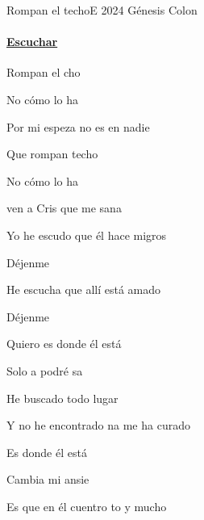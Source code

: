 \documentclass[12pt, spanish]{book}
\begin{document}
    \begin{song}{Rompan el techo}{E}
        {2024} %
        {Génesis Colon}
        {} %
        {}
        \ifChordBk
        \paragraph{\mbox{}\hfill\protect\href{https://open.spotify.com/intl-es/track/7dooEx4uwQ7Z2eZoMdmtZT}{Escuchar}\mbox{}\hfill}
        \fi

        \begin{SBOpGroup}
            Rompan el cho

            No  cómo lo ha

            Por mi espeza no es en nadie 
        \end{SBOpGroup}

        \begin{SBOpGroup}
            Que rompan  techo

            No  cómo lo ha

            ven a Cris que  me sana
        \end{SBOpGroup}

        \begin{SBOpGroup}
            Yo he escudo que él hace migros

            Déjenme 

            He escucha que allí está  amado

            Déjenme 
        \end{SBOpGroup}

        \begin{SBChorus}
            Quiero es donde él está

            Solo a podré sa

            He buscado  todo lugar

            Y no he encontrado na me ha curado


            Es donde él está

            Cambia mi ansie

            Es que en él cuentro to y mucho 
        \end{SBChorus}


\end{song}
\end{document}

